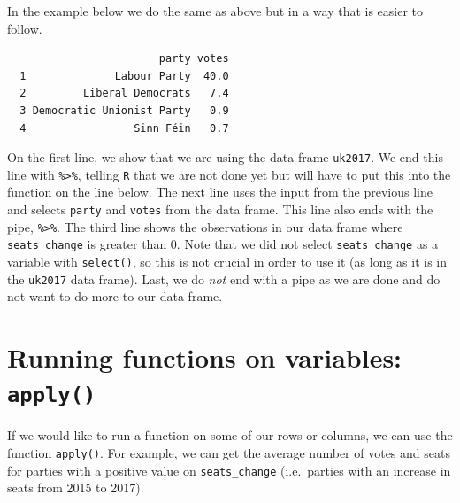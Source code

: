 \documentclass[12pt,oneside]{reedthesis}
\theoremstyle{definition}
\theoremstyle{definition}
\theoremstyle{definition}
\theoremstyle{remark}
\begin{document}
  In the example below we do the same as above but in a way that is easier
  to follow.
  \begin{Shaded}
  \end{Shaded}
  \begin{verbatim}
                        party votes
  1              Labour Party  40.0
  2         Liberal Democrats   7.4
  3 Democratic Unionist Party   0.9
  4                 Sinn Féin   0.7
  \end{verbatim}
  On the first line, we show that we are using the data frame
  \texttt{uk2017}. We end this line with \texttt{\%\textgreater{}\%},
  telling \texttt{R} that we are not done yet but will have to put this
  into the function on the line below. The next line uses the input from
  the previous line and selects \texttt{party} and \texttt{votes} from the
  data frame. This line also ends with the pipe,
  \texttt{\%\textgreater{}\%}. The third line shows the observations in
  our data frame where \texttt{seats\_change} is greater than 0. Note that
  we did not select \texttt{seats\_change} as a variable with
  \texttt{select()}, so this is not crucial in order to use it (as long as
  it is in the \texttt{uk2017} data frame). Last, we do \emph{not} end
  with a pipe as we are done and do not want to do more to our data frame.
  
  \section{\texorpdfstring{Running functions on variables:
  \texttt{apply()}}{Running functions on variables: apply()}}\label{running-functions-on-variables-apply}
  
  If we would like to run a function on some of our rows or columns, we
  can use the function \texttt{apply()}. For example, we can get the
  average number of votes and seats for parties with a positive value on
  \texttt{seats\_change} (i.e.~parties with an increase in seats from 2015
  to 2017).
  
\end{document}
